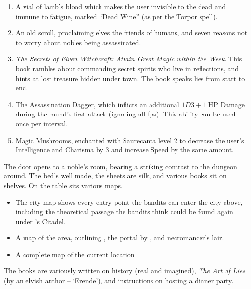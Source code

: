 \begin{enumerate}

  \item
  A vial of lamb's blood which makes the user invisible to the dead and immune to fatigue, marked ``Dead Wine'' (as per the Torpor spell).
  \item
  An old scroll, proclaiming elves the friends of humans, and seven reasons not to worry about nobles being assassinated.
  \item
  \textit{The Secrets of Elven Witchcraft: Attain Great Magic within the Week}.
  This book rambles about commanding secret spirits who live in reflections, and hints at lost treasure hidden under \gls{town}.
  The book speaks lies from start to end.
  \item
  The Assassination Dagger, which inflicts an additional $1D3+1$ HP Damage during the round's first attack (ignoring all \glspl{fp}).
  This ability can be used once per \gls{interval}.
  \item
  Magic Mushrooms, enchanted with Saurecanta level 2 to decrease the user's Intelligence and Charisma by 3 and increase Speed by the same amount.
\end{enumerate}

\begin{boxtext}
  The door opens to a noble's room, bearing a striking contrast to the dungeon around.  The bed's well made, the sheets are silk, and various books sit on shelves.  On the table sits various maps.
\end{boxtext}

\label{sewerKingRoom}

\begin{itemize}
  \item
  The city map shows every entry point the bandits can enter the city above, including the theoretical passage the bandits think could be found again under 's Citadel.
  \item
  A map of the area, outlining , the portal by , and \gls{necromancer}'s lair.
  \item
  A complete map of the current location
\end{itemize}

The books are variously written on history (real and imagined), \textit{The Art of Lies} (by an elvish author -- `Erende'), and instructions on hosting a dinner party.


